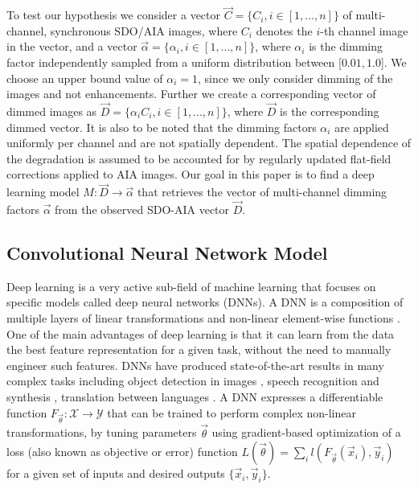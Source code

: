\documentclass{aa}
\begin{document}
To test our hypothesis we consider a vector $\vec{C} = \{C_i, i\in [1,...,n]\}$ of multi-channel, synchronous SDO/AIA images, where $C_i$ denotes the $i$-th channel image in the vector, and a vector $\vec{\alpha} = \{\alpha_i, i \in [1,...,n]\}$, where $\alpha_i$ is the dimming factor independently sampled from a uniform distribution between [$0.01, 1.0$]. We choose an upper bound value of  $\alpha_i = 1$, since we only consider dimming of the images and not enhancements. Further we create a corresponding vector of dimmed images as $\vec{D} = \{\alpha_i C_i, i\in [1,...,n]\}$, where $\vec{D}$ is the corresponding dimmed vector. It is also to be noted that the dimming factors $\alpha_i$ are applied uniformly per channel and are not spatially dependent. The spatial dependence of the degradation is assumed to be accounted for by regularly updated flat-field corrections applied to AIA images. Our goal in this paper is to find a deep learning model $M: \vec{D} \rightarrow \vec{\alpha}$ that retrieves the vector of multi-channel dimming factors $\vec{\alpha}$ from the observed SDO-AIA vector $\vec{D}$. 

\subsection{Convolutional Neural Network Model}
\label{section:convolutional}
Deep learning is a very active sub-field of machine learning that focuses on specific models called deep neural networks (DNNs). A DNN is a composition of multiple layers of linear transformations and non-linear element-wise functions \citep{goodfellow2016deep}. One of the main advantages of deep learning is that it can learn from the data the best feature representation for a given task, without the need to manually engineer such features. DNNs have produced state-of-the-art results in many complex tasks including object detection in images \citep{he2016deep}, speech recognition \citep{amodei2016deep} and synthesis \citep{oord2016wavenet}, translation between languages \citep{wu2016google}. A DNN expresses a differentiable function $F_{\vec\theta}: \mathcal{X} \to \mathcal{Y}$ that can be trained to perform complex non-linear transformations, by tuning parameters $\vec{\theta}$ using gradient-based optimization of a loss (also known as objective or error) function $L(\vec{\theta}) = \sum_i l(F_{\vec\theta}(\vec{x}_i), \vec{y}_i)$ for a given set of inputs and desired outputs $\{\vec{x}_i, \vec{y}_i\}$.
\end{document}
